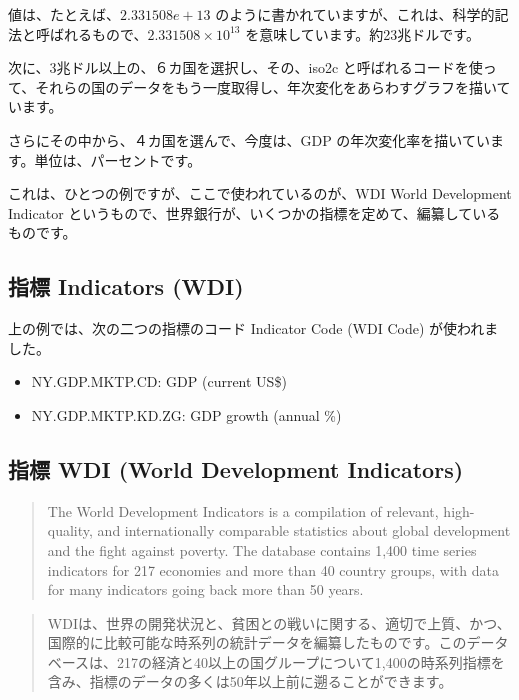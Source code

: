 \documentclass[
  xelatex, ja=standard]{bxjsbook}
\providecommand{\tightlist}{%
  \setlength{\itemsep}{0pt}\setlength{\parskip}{0pt}}
\theoremstyle{definition}
\theoremstyle{definition}
\theoremstyle{definition}
\theoremstyle{definition}
\theoremstyle{remark}
\begin{document}
値は、たとえば、\(2.331508e+13\) のように書かれていますが、これは、科学的記法と呼ばれるもので、\(2.331508 \times 10^{13}\) を意味しています。約23兆ドルです。

次に、3兆ドル以上の、６カ国を選択し、その、iso2c と呼ばれるコードを使って、それらの国のデータをもう一度取得し、年次変化をあらわすグラフを描いています。

さらにその中から、４カ国を選んで、今度は、GDP の年次変化率を描いています。単位は、パーセントです。

これは、ひとつの例ですが、ここで使われているのが、WDI World Development Indicator というもので、世界銀行が、いくつかの指標を定めて、編纂しているものです。

\hypertarget{ux6307ux6a19-indicators-wdi}{%
\subsection{指標 Indicators (WDI)}\label{ux6307ux6a19-indicators-wdi}}

上の例では、次の二つの指標のコード Indicator Code (WDI Code) が使われました。

\begin{itemize}
\tightlist
\item
  NY.GDP.MKTP.CD: GDP (current US\$)
\item
  NY.GDP.MKTP.KD.ZG: GDP growth (annual \%)
\end{itemize}

\hypertarget{ux6307ux6a19-wdi-world-development-indicators}{%
\subsection{指標 WDI (World Development Indicators)}\label{ux6307ux6a19-wdi-world-development-indicators}}

\begin{quote}
The World Development Indicators is a compilation of relevant, high-quality, and internationally comparable statistics about global development and the fight against poverty. The database contains 1,400 time series indicators for 217 economies and more than 40 country groups, with data for many indicators going back more than 50 years.
\end{quote}

\begin{quote}
WDIは、世界の開発状況と、貧困との戦いに関する、適切で上質、かつ、国際的に比較可能な時系列の統計データを編纂したものです。このデータベースは、217の経済と40以上の国グループについて1,400の時系列指標を含み、指標のデータの多くは50年以上前に遡ることができます。
\end{quote}
\end{document}
